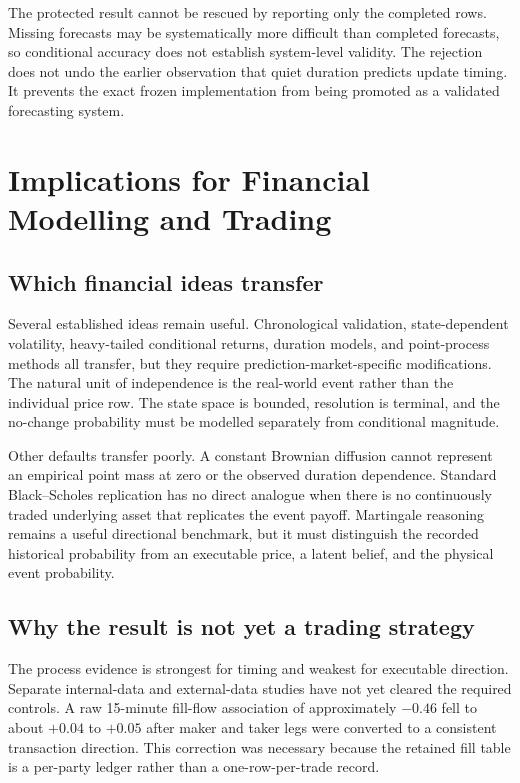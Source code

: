 \documentclass[11pt]{article}
\begin{document}
The protected result cannot be rescued by reporting only the completed rows. Missing forecasts
may be systematically more difficult than completed forecasts, so conditional accuracy does not
establish system-level validity. The rejection does not undo the earlier observation that quiet
duration predicts update timing. It prevents the exact frozen implementation from being promoted
as a validated forecasting system.

\section{Implications for Financial Modelling and Trading}

\subsection{Which financial ideas transfer}

Several established ideas remain useful. Chronological validation, state-dependent volatility,
heavy-tailed conditional returns, duration models, and point-process methods all transfer, but
they require prediction-market-specific modifications. The natural unit of independence is the
real-world event rather than the individual price row. The state space is bounded, resolution is
terminal, and the no-change probability must be modelled separately from conditional magnitude.

Other defaults transfer poorly. A constant Brownian diffusion cannot represent an empirical
point mass at zero or the observed duration dependence. Standard Black--Scholes replication has
no direct analogue when there is no continuously traded underlying asset that replicates the
event payoff. Martingale reasoning remains a useful directional benchmark, but it must distinguish
the recorded historical probability from an executable price, a latent belief, and the physical
event probability.

\subsection{Why the result is not yet a trading strategy}

The process evidence is strongest for timing and weakest for executable direction. Separate
internal-data and external-data studies have not yet cleared the required controls. A raw
15-minute fill-flow association of approximately $-0.46$ fell to about $+0.04$ to $+0.05$ after
maker and taker legs were converted to a consistent transaction direction. This correction was
necessary because the retained fill table is a per-party ledger rather than a one-row-per-trade
record.
\end{document}
